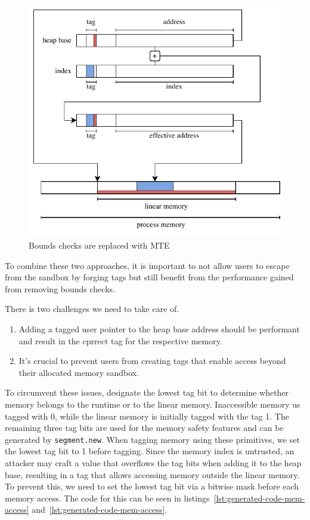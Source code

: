 \begin{figure}[t]
    \centering
    \includegraphics[scale=0.75]{figures/build/bounds-mem-safety}
    \caption{Bounds checks are replaced with MTE}
    \label{fig:system-design-mem-safety-bounds}
\end{figure}

To combine these two approaches, it is important to not allow users to escape from the sandbox by forging tags but still benefit from the
performance gained from removing bounds checks.

There is two challenges we need to take care of.
\begin{enumerate}
    \item Adding a tagged user pointer to the heap base address should be performant and result in the cprrect tag for the respective memory.
    \item It's crucial to prevent users from creating tags that enable access beyond their allocated memory sandbox.
\end{enumerate}

To circumvent these issues, designate the lowest tag bit to determine whether memory belongs to the runtime or to the linear memory.
Inaccessible memory us tagged with 0, while the linear memory is initially tagged with the tag 1.
The remaining three tag bits are used for the memory safety features and can be generated by \texttt{segment.new}.
When tagging memory using these primitives, we set the lowest tag bit to 1 before tagging.
Since the memory index is untrusted, an attacker may craft a value that overflows the tag bits when adding it to the heap base, resulting in a tag that allows accessing memory outside the linear memory.
To prevent this, we need to set the lowest tag bit via a bitwise mask before each memory access.
The code for this can be seen in listings~\ref{lst:generated-code-mem-access} and~\ref{lst:generated-code-mem-access}.

